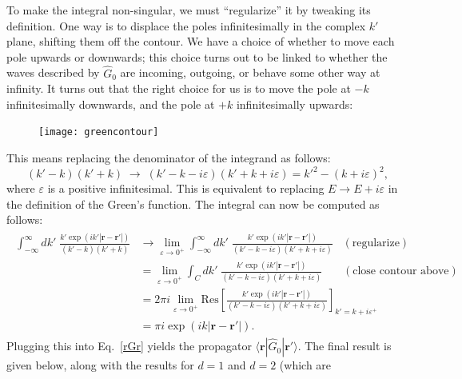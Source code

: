 \documentclass[pra,12pt]{revtex4}
\begin{document}
To make the integral non-singular, we must ``regularize'' it by
tweaking its definition.  One way is to displace the poles
infinitesimally in the complex $k'$ plane, shifting them off the
contour.  We have a choice of whether to move each pole upwards or
downwards; this choice turns out to be linked to whether the waves
described by $\hat{G}_0$ are incoming, outgoing, or behave some other
way at infinity.  It turns out that the right choice for us is to move
the pole at $-k$ infinitesimally downwards, and the pole at $+k$
infinitesimally upwards:

\begin{figure}[h!]
  \centering\texttt{[image: greencontour]}
\end{figure}

\noindent
This means replacing the denominator of the integrand as
follows:
\begin{equation}
  (k' - k)(k'+k) \;\rightarrow\; (k' - k - i\varepsilon)(k'+k+i\varepsilon) = {k'}^2 - (k+i\varepsilon)^2,
\end{equation}
where $\varepsilon$ is a positive infinitesimal.  This is equivalent
to replacing $E \rightarrow E + i\varepsilon$ in the definition of the
Green's function.  The integral can now be computed as
follows:
\begin{align*}
  \begin{aligned}\int_{-\infty}^\infty dk' \; \frac{\displaystyle k' \exp\left(ik'|\mathbf{r}-\mathbf{r}'|\right)}{(k' - k)(k'+k)} &\rightarrow \lim_{\varepsilon \rightarrow 0^+} \int_{-\infty}^\infty dk' \; \frac{\displaystyle k' \exp\left(ik'|\mathbf{r}-\mathbf{r}'|\right)}{(k' - k - i\varepsilon)(k'+k+i\varepsilon)}\;\;\; (\text{regularize}) \\ &= \lim_{\varepsilon \rightarrow 0^+} \int_C dk' \; \frac{\displaystyle k' \exp\left(ik'|\mathbf{r}-\mathbf{r}'|\right)}{(k' - k - i\varepsilon)(k'+k+i\varepsilon)} \quad\;\;\; (\text{close contour above}) \\ &= 2\pi i \lim_{\varepsilon \rightarrow 0^+} \mathrm{Res}\left[\frac{\displaystyle k' \exp\left(ik'|\mathbf{r}-\mathbf{r}'|\right)}{(k' - k - i\varepsilon)(k'+k+i\varepsilon)}\right]_{k'=k+i\varepsilon^+} \\ &= \pi i \exp\left(ik|\mathbf{r}-\mathbf{r}'|\right).\end{aligned}
\end{align*}
Plugging this into Eq.~\eqref{rGr} yields the propagator
$\langle\mathbf{r}|\hat{G}_0|\mathbf{r}'\rangle$.  The final result is
given below, along with the results for $d=1$ and $d=2$ (which are
\end{document}
